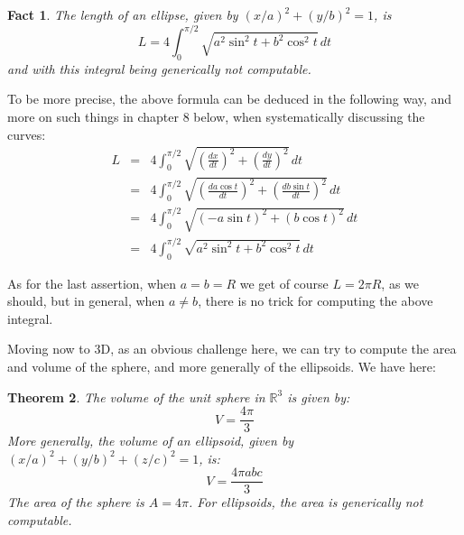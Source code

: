 \documentclass[12pt]{amsbook}
\newtheorem{theorem}{Theorem}[chapter]
\newtheorem{fact}[theorem]{Fact}
\begin{document}
\begin{fact}
The length of an ellipse, given by $(x/a)^2+(y/b)^2=1$, is
$$L=4\int_0^{\pi/2}\sqrt{a^2\sin^2t+b^2\cos^2t}\,dt$$
and with this integral being generically not computable.
\end{fact}

To be more precise, the above formula can be deduced in the following way, and more on such things in chapter 8 below, when systematically discussing the curves:
\begin{eqnarray*}
L
&=&4\int_0^{\pi/2}\sqrt{\left(\frac{dx}{dt}\right)^2+\left(\frac{dy}{dt}\right)^2}\,dt\\
&=&4\int_0^{\pi/2}\sqrt{\left(\frac{da\cos t}{dt}\right)^2+\left(\frac{db\sin t}{dt}\right)^2}\,dt\\
&=&4\int_0^{\pi/2}\sqrt{(-a\sin t)^2+(b\cos t)^2}\,dt\\
&=&4\int_0^{\pi/2}\sqrt{a^2\sin^2t+b^2\cos^2t}\,dt
\end{eqnarray*}

As for the last assertion, when $a=b=R$ we get of course $L=2\pi R$, as we should, but in general, when $a\neq b$, there is no trick for computing the above integral.

\bigskip

Moving now to 3D, as an obvious challenge here, we can try to compute the area and volume of the sphere, and more generally of the ellipsoids. We have here:


\begin{theorem}
The volume of the unit sphere in $\mathbb R^3$ is given by:
$$V=\frac{4\pi}{3}$$
More generally, the volume of an ellipsoid, given by $(x/a)^2+(y/b)^2+(z/c)^2=1$, is:
$$V=\frac{4\pi abc}{3}$$
The area of the sphere is $A=4\pi$. For ellipsoids, the area is generically not computable.
\end{theorem}
\end{document}
